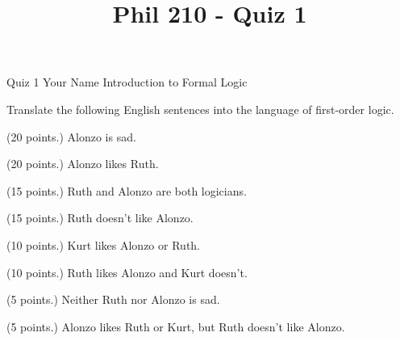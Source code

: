 
\title{Phil 210 - Quiz 1}

\heading
Quiz 1
Your Name
Introduction to Formal Logic
\endheading

Translate the following English sentences into the language of first-order logic.

\problems
{} (20 points.)
Alonzo is sad.
        \answer
        $ $
        \endanswer

 (20 points.)
Alonzo likes Ruth.
        \answer
        $ $
        \endanswer

 (15 points.)
Ruth and Alonzo are both logicians.
        \answer
        $ $
        \endanswer

 (15 points.)
Ruth doesn't like Alonzo.
        \answer
        $ $
        \endanswer

 (10 points.)
Kurt likes Alonzo or Ruth.
        \answer
        $ $
        \endanswer

 (10 points.)
Ruth likes Alonzo and Kurt doesn't.
        \answer
        $ $
        \endanswer

 (5 points.)
Neither Ruth nor Alonzo is sad.
        \answer
        $ $
        \endanswer

 (5 points.)
Alonzo likes Ruth or Kurt, but Ruth doesn't like Alonzo.
        \answer
        $ $
        \endanswer

\endproblems
\bye
